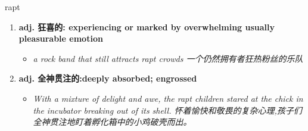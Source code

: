 
\begin{frame}
{\huge rapt}
\begin{center}
\begin{enumerate}\Large
  \item \textbf{adj. 狂喜的: experiencing or marked by overwhelming usually pleasurable emotion}
  \begin{itemize}
    \item \em{\Large{a rock band that still attracts rapt crowds 一个仍然拥有者狂热粉丝的乐队}}
  \end{itemize}
  \item \textbf{adj. 全神贯注的:deeply absorbed; engrossed}
  \begin{itemize}
    \item \em{\Large{With a mixture of delight and awe, the rapt children stared at the chick in the incubator breaking out of its shell. 怀着愉快和敬畏的复杂心理,孩子们全神贯注地盯着孵化箱中的小鸡破壳而出。}}
  \end{itemize}
\end{enumerate}
\end{center}
\end{frame}
